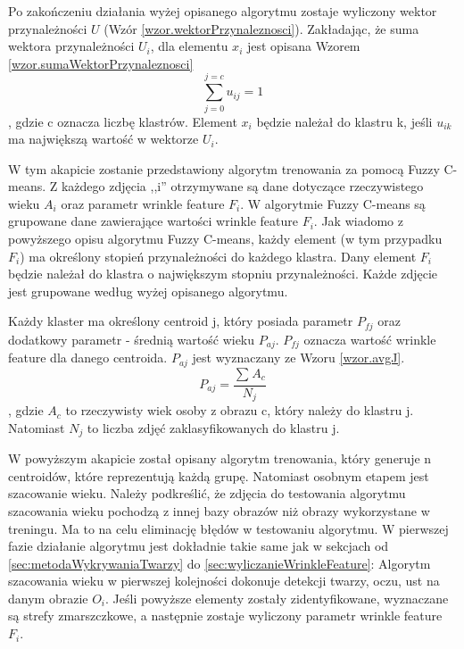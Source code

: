 \documentclass[a4paper,twoside,12pt]{book}
\begin{document}
    Po zakończeniu działania wyżej opisanego algorytmu zostaje wyliczony wektor przynależności $U$
    (Wzór \ref{wzor.wektorPrzynaleznosci}).
    Zakładając, że suma wektora przynależności $U_{i}$, dla elementu $x_{i}$ jest opisana
    Wzorem \ref{wzor.sumaWektorPrzynaleznosci}
    \large
    \begin{equation}
        \sum_{j=0}^{j=c} u_{ij}=1
        \label{wzor.sumaWektorPrzynaleznosci}
    \end{equation}
    \normalsize
    , gdzie c oznacza liczbę klastrów.
    Element $x_{i}$ będzie należał do klastru k, jeśli $u_{ik}$ ma największą wartość w wektorze $U_{i}$.

    W tym akapicie zostanie przedstawiony algorytm trenowania za pomocą Fuzzy C-means.
    Z każdego zdjęcia ,,i'' otrzymywane są dane dotyczące rzeczywistego wieku $A_{i}$ oraz parametr wrinkle feature
    $F_{i}$.
    W algorytmie Fuzzy C-means są grupowane dane zawierające wartości wrinkle feature $F_{i}$.
    Jak wiadomo z powyższego opisu algorytmu Fuzzy C-means, każdy element (w tym przypadku $F_{i}$) ma określony stopień
    przynależności do każdego klastra. Dany element $F_{i}$ będzie należał do klastra o największym stopniu
    przynależności. Każde zdjęcie jest grupowane według wyżej opisanego algorytmu.

    Każdy klaster ma określony centroid j, który posiada parametr $P_{fj}$  oraz dodatkowy parametr - średnią
    wartość wieku $P_{aj}$. $P_{fj}$ oznacza wartość wrinkle feature dla danego centroida.
    $P_{aj}$ jest wyznaczany ze Wzoru \ref{wzor.avgJ}.
    \large
    \begin{equation}
        P_{aj}=\frac{\sum_{}^{}A_{c}}{N_{j}}
        \label{wzor.avgJ}
    \end{equation}
    \normalsize
    , gdzie $A_{c}$ to rzeczywisty wiek osoby z obrazu c, który należy do klastru j.
    Natomiast $N_{j}$ to liczba zdjęć zaklasyfikowanych do klastru j.

    W powyższym akapicie został opisany algorytm trenowania, który generuje n centroidów, które reprezentują każdą
    grupę. Natomiast osobnym etapem jest szacowanie wieku. Należy podkreślić, że zdjęcia do testowania algorytmu szacowania wieku
    pochodzą z innej bazy obrazów niż obrazy wykorzystane w treningu. Ma to na celu eliminację błędów w testowaniu algorytmu.
    W pierwszej fazie działanie algorytmu jest dokładnie takie same jak w sekcjach od \ref{sec:metodaWykrywaniaTwarzy}
    do \ref{sec:wyliczanieWrinkleFeature}:
    Algorytm szacowania wieku w pierwszej kolejności dokonuje detekcji twarzy, oczu, ust na danym obrazie $O_{i}$.
    Jeśli powyższe elementy zostały zidentyfikowane, wyznaczane są strefy zmarszczkowe,
    a następnie zostaje wyliczony parametr wrinkle feature $F_{i}$.
\end{document}
